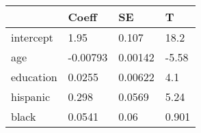 \begin{tabular}{llll}
\hline 
& Coeff & SE & T \\ 
\hline 
intercept & 1.95 & 0.107 & 18.2 \\ 
age & -0.00793 & 0.00142 & -5.58 \\ 
education & 0.0255 & 0.00622 & 4.1 \\ 
hispanic & 0.298 & 0.0569 & 5.24 \\ 
black & 0.0541 & 0.06 & 0.901 \\ 
\hline 
\end{tabular}